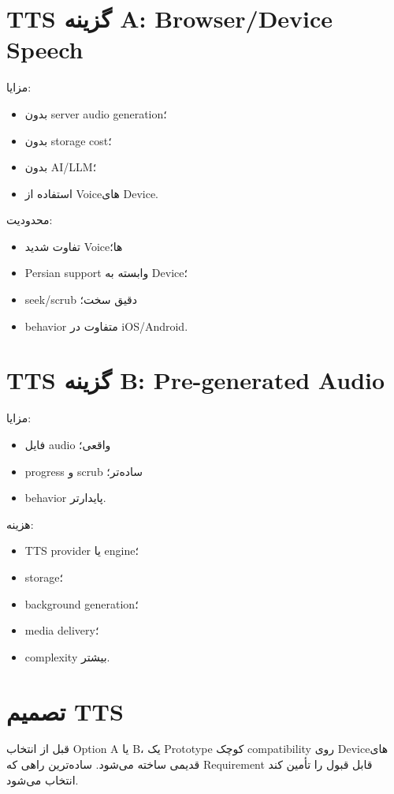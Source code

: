 \section{TTS گزینه A: Browser/Device Speech}

مزایا:
\begin{itemize}
  \item بدون server audio generation؛
  \item بدون storage cost؛
  \item بدون AI/LLM؛
  \item استفاده از Voiceهای Device.
\end{itemize}

محدودیت:
\begin{itemize}
  \item تفاوت شدید Voiceها؛
  \item Persian support وابسته به Device؛
  \item seek/scrub دقیق سخت؛
  \item behavior متفاوت در iOS/Android.
\end{itemize}

\section{TTS گزینه B: Pre-generated Audio}

مزایا:
\begin{itemize}
  \item فایل audio واقعی؛
  \item progress و scrub ساده‌تر؛
  \item behavior پایدارتر.
\end{itemize}

هزینه:
\begin{itemize}
  \item TTS provider یا engine؛
  \item storage؛
  \item background generation؛
  \item media delivery؛
  \item complexity بیشتر.
\end{itemize}

\section{تصمیم TTS}

\begin{decisionbox}
قبل از انتخاب Option A یا B، یک Prototype کوچک compatibility روی Deviceهای قدیمی ساخته می‌شود. ساده‌ترین راهی که Requirement قابل قبول را تأمین کند انتخاب می‌شود.
\end{decisionbox}

